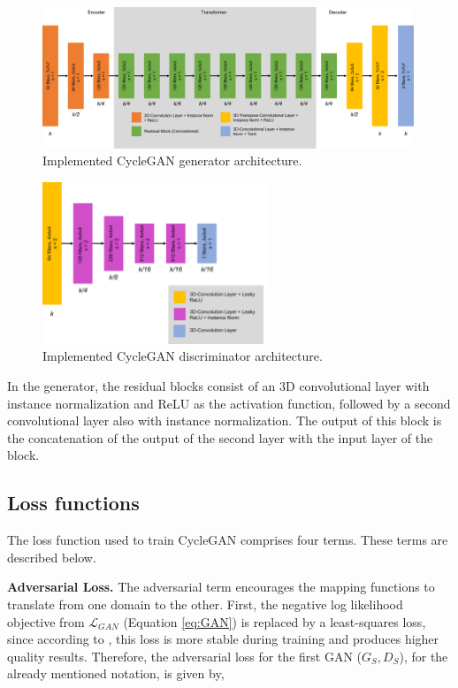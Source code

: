 \begin{figure}[!htb]
  \centering
  \includegraphics[width=0.99\textwidth]{Images/generator_cyclegan.jpg}
  \caption[Implemented CycleGAN generator architecture.]{Implemented CycleGAN generator architecture.}
  \label{fig:gencyc}
\end{figure}

\begin{figure}[!htb]
  \centering
  \includegraphics[width=0.60\textwidth]{Images/discriminator_cyclegan.jpg}
  \caption[Implemented CycleGAN discriminator architecture.]{Implemented CycleGAN discriminator architecture.}
  \label{fig:disccyc}
\end{figure}

In the generator, the residual blocks consist of an \ac{3D} convolutional layer with instance normalization and ReLU as the activation function, followed by a second convolutional layer also with instance normalization.  The output of this block is the concatenation of the output of the second layer with the input layer of the block.

\subsection*{Loss functions}

The loss function used to train CycleGAN comprises four terms. These terms are described below.

\textbf{Adversarial Loss.} The adversarial term encourages the mapping functions to translate from one domain to
the other. First, the negative log likelihood objective from $\mathcal{L}_{GAN}$  (Equation \ref{eq:GAN}) is replaced by a least-squares loss, since according to \cite{cycleGAN:original}, this loss is more stable during training and produces higher quality results. Therefore, the adversarial loss for the first GAN ($G_{S}, D_S$), for the already mentioned notation, is given by,

